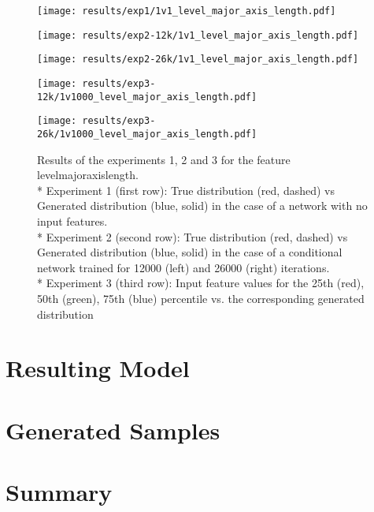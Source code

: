 \begin{figure}[h!]
	\begin{minipage}{0.5\linewidth}
		\texttt{[image: results/exp1/1v1\_level\_major\_axis\_length.pdf]}
	\end{minipage}
	
	\begin{minipage}{0.5\linewidth}
		\texttt{[image: results/exp2-12k/1v1\_level\_major\_axis\_length.pdf]}
	\end{minipage}
	\begin{minipage}{0.5\linewidth}
		\texttt{[image: results/exp2-26k/1v1\_level\_major\_axis\_length.pdf]}
	\end{minipage}
	
	\begin{minipage}{0.5\linewidth}
		\texttt{[image: results/exp3-12k/1v1000\_level\_major\_axis\_length.pdf]}
	\end{minipage}
	\begin{minipage}{0.5\linewidth}
		\texttt{[image: results/exp3-26k/1v1000\_level\_major\_axis\_length.pdf]}
	\end{minipage}
	\caption[ Results: Input feature level\textunderscore major\textunderscore axis\textunderscore length]{ Results of the experiments 1, 2 and 3 for the feature level\textunderscore major\textunderscore axis\textunderscore length. \\* Experiment 1 (first row): True distribution (red, dashed) vs Generated distribution (blue, solid) in the case of a network with no input features. \\* Experiment 2 (second row): True distribution (red, dashed) vs Generated distribution (blue, solid) in the case of a conditional network trained for 12000 (left) and 26000 (right) iterations. \\* Experiment 3 (third row): Input feature values for the 25th (red), 50th (green), 75th (blue) percentile vs. the corresponding generated distribution}
	\label{fig:results_level_major_axis_length}
\end{figure}



	
\section{Resulting Model}
\label{sec:sampling}
\section{Generated Samples}
\section{Summary}